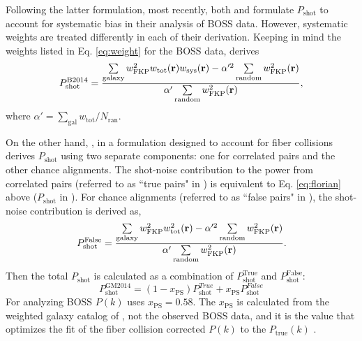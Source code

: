 \documentclass{emulateapj}
\begin{document}
Following the latter formulation, most recently, both \cite{Beutler:2014aa} and \cite{Gil-Marin:2014aa} formulate $P_\mathrm{shot}$ to account for systematic bias in their analysis of BOSS data. However, systematic weights are treated differently in each of their derivation. Keeping in mind the weights listed in Eq. \ref{eq:weight} for the BOSS data, \cite{Beutler:2014aa} derives
\begin{equation} \label{eq:florian}
P^\mathrm{B2014}_\mathrm{shot} = \frac{\sum\limits_{\mathrm{galaxy}} w^2_\mathrm{FKP}w_\mathrm{tot}({\bf r})w_\mathrm{sys}({\bf r}) - \alpha'^2 \sum\limits_{\mathrm{random}} w_\mathrm{FKP}^2({\bf r})}{\alpha' \sum\limits_{\mathrm{random}}w_\mathrm{FKP}^2({\bf r})}, 
\end{equation}
where $\alpha' = \sum_\mathrm{gal} w_\mathrm{tot} / N_\mathrm{ran}$. 

On the other hand, \cite{Gil-Marin:2014aa}, in a formulation designed to account for fiber collisions derives $P_\mathrm{shot}$ using two separate components: one for correlated pairs and the other chance alignments. The shot-noise contribution to the power from correlated pairs (referred to as ``true pairs" in \citealt{Gil-Marin:2014aa}) is equivalent to Eq. \ref{eq:florian} above ($P_\mathrm{shot}$ in \cite{Beutler:2014aa}). For chance alignments (referred to as ``false pairs" in \citealt{Gil-Marin:2014aa}), the shot-noise contribution is derived as, 
\begin{equation} \label{eq:gm_falsepairs}
P^\mathrm{False}_\mathrm{shot} = \frac{\sum\limits_{\mathrm{galaxy}} w^2_\mathrm{FKP}w^2_\mathrm{tot}({\bf r}) - \alpha'^2 \sum\limits_{\mathrm{random}} w_\mathrm{FKP}^2({\bf r})}{\alpha' \sum\limits_{\mathrm{random}}w_\mathrm{FKP}^2({\bf r})}.
\end{equation}
Then the total $P_\mathrm{shot}$ is calculated as a combination of $P^\mathrm{True}_\mathrm{shot}$ and $P^\mathrm{False}_\mathrm{shot}$: 
\begin{equation} \label{eq:gm_shot}
P^\mathrm{GM2014}_\mathrm{shot} = (1- x_\mathrm{PS}) P^{True}_\mathrm{shot} + x_\mathrm{PS} P^{False}_\mathrm{shot}
\end{equation}
For analyzing BOSS $P(k)$ \cite{Gil-Marin:2014aa} uses $x_\mathrm{PS} = 0.58$. The $x_\mathrm{PS}$ is calculated from the weighted galaxy catalog of \cite{Manera:2013aa}, not the observed BOSS data, and it is the value that optimizes the fit of the fiber collision corrected $P(k)$ to the $P_\mathrm{true}(k)$ .  
\end{document}
